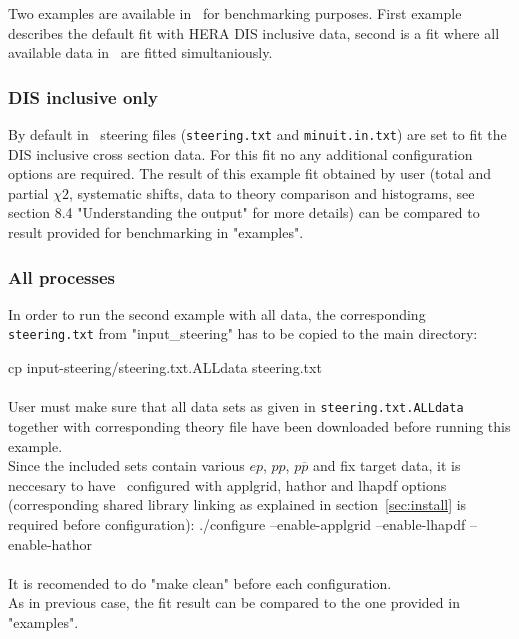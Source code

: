 
\label{section:example}
Two examples are available in \fitter\ for benchmarking purposes.
First example describes the default fit with HERA DIS inclusive data,
second is a fit where all available data in \fitter\ are fitted simultaniously.

\subsubsection{DIS inclusive only}
By default in \fitter\ steering files ({\tt steering.txt} and {\tt minuit.in.txt})
are set to fit the DIS inclusive cross section data. For this fit no any additional
configuration options are required.
The result of this example fit obtained by user (total and partial $\chi2$, systematic shifts, 
data to theory comparison and histograms, see section 8.4 "Understanding the output" for more details) 
can be compared to result provided for benchmarking in "examples".

\subsubsection{All processes}
In order to run the second example with all data, the corresponding
{\tt steering.txt} from "input\_steering" has to be copied to the main directory:

\goodbreak                 
cp input-steering/steering.txt.ALLdata steering.txt
\\ \\
User must make sure that all data sets as given in {\tt steering.txt.ALLdata} together with corresponding theory file have been downloaded  
before running this example. 
\\
Since the included sets contain various $ep$, $pp$, $p \overline p$ and fix target
data, it is neccesary to have \fitter\ configured with applgrid, hathor and 
lhapdf options (corresponding shared library linking as explained in section~\ref{sec:install} is
required before configuration): 
\goodbreak
./configure --enable-applgrid --enable-lhapdf --enable-hathor
\\ \\
It is recomended to do "make clean" before each configuration. \\        
As in previous case, the fit result can be compared to the one provided in "examples".




